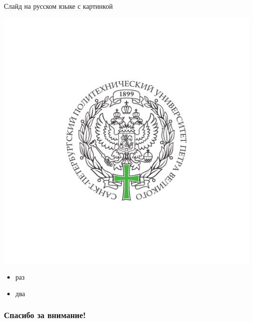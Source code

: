 \documentclass{beamer}
\begin{document}
\begin{frame}{Слайд на русском языке с картинкой}
\begin{multicols}{2}
	\includegraphics[width=\columnwidth]{img/emblem01.pdf}
	\columnbreak
	\begin{itemize}
		\item раз
		\item два
	\end{itemize}
\end{multicols}
\end{frame}


\begin{frame}[plain]

\begin{center}
	\frametitle{\LARGE Спасибо за внимание!}
	
	{\LARGE \inserttitle}
	
	\bigskip
	
	{\insertauthor} 
	
	\bigskip\bigskip
	
	{\insertinstitute}
	
	\bigskip\bigskip
	
	{\large \insertdate}
\end{center}
\end{frame}
\end{document}
